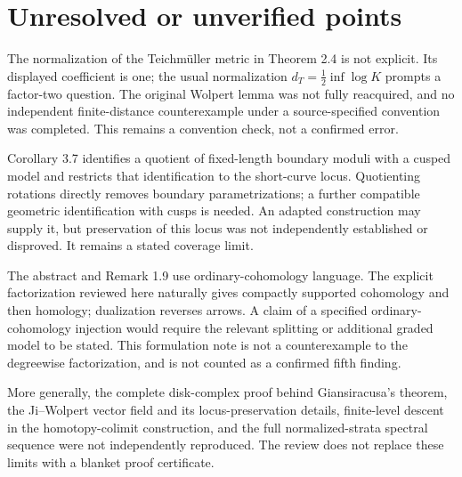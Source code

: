 \documentclass[10pt]{article}
\begin{document}
\section*{Unresolved or unverified points}
The normalization of the Teichmüller metric in Theorem 2.4 is not explicit. Its displayed coefficient is one; the usual normalization \(d_T=\tfrac12\inf\log K\) prompts a factor-two question. The original Wolpert lemma was not fully reacquired, and no independent finite-distance counterexample under a source-specified convention was completed. This remains a convention check, not a confirmed error.\par
Corollary 3.7 identifies a quotient of fixed-length boundary moduli with a cusped model and restricts that identification to the short-curve locus. Quotienting rotations directly removes boundary parametrizations; a further compatible geometric identification with cusps is needed. An adapted construction may supply it, but preservation of this locus was not independently established or disproved. It remains a stated coverage limit.\par
The abstract and Remark 1.9 use ordinary-cohomology language. The explicit factorization reviewed here naturally gives compactly supported cohomology and then homology; dualization reverses arrows. A claim of a specified ordinary-cohomology injection would require the relevant splitting or additional graded model to be stated. This formulation note is not a counterexample to the degreewise factorization, and is not counted as a confirmed fifth finding.\par
More generally, the complete disk-complex proof behind Giansiracusa’s theorem, the Ji–Wolpert vector field and its locus-preservation details, finite-level descent in the homotopy-colimit construction, and the full normalized-strata spectral sequence were not independently reproduced. The review does not replace these limits with a blanket proof certificate.\par
\end{document}
